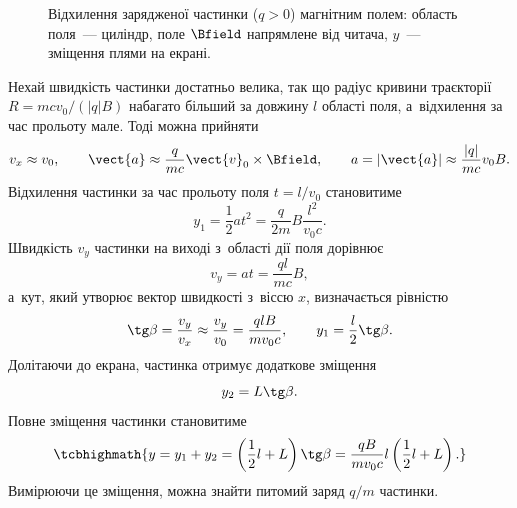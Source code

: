 \begin{figure}[h!]
	\centering
	\caption{Відхилення зарядженої частинки ($q>0$) магнітним полем: область поля~--- циліндр, поле $\Bfield$ напрямлене від читача, $y$~--- зміщення плями на екрані.}
	\label{tikz:magnetic_deflection}
\end{figure}

Нехай швидкість частинки достатньо велика, так що радіус кривини траєкторії $R = mcv_0/(|q|B)$ набагато більший за довжину $l$ області поля, а~відхилення за час прольоту мале. Тоді можна прийняти
\begin{equation}\label{eq:a_B_approx}
	v_x \approx v_0, \qquad
	\vect{a} \approx \frac{q}{mc}\vect{v}_0 \times \Bfield, \qquad
	a = |\vect{a}| \approx \frac{|q|}{mc}v_0 B.
\end{equation}
Відхилення частинки за час прольоту поля $t = l/v_0$ становитиме
\begin{equation}\label{eq:y1_B}
	y_1 = \frac{1}{2}at^2 = \frac{q}{2m}B\frac{l^2}{v_0 c}.
\end{equation}
Швидкість $v_y$ частинки на виході з~області дії поля дорівнює
\begin{equation}\label{eq:vy_B}
	v_y = at = \frac{ql}{mc}B,
\end{equation}
а~кут, який утворює вектор швидкості з~віссю $x$, визначається рівністю
\begin{equation}\label{eq:tg_beta}
	\tg\beta = \frac{v_y}{v_x} \approx \frac{v_y}{v_0} = \frac{qlB}{mv_0 c}, \qquad
	y_1 = \frac{l}{2}\tg\beta.
\end{equation}
Долітаючи до екрана, частинка отримує додаткове зміщення
\begin{equation}\label{eq:y2_B}
	y_2 = L \tg\beta.
\end{equation}
Повне зміщення частинки становитиме
\begin{equation}\label{eq:y_total_B}
	\tcbhighmath{
		y = y_1 + y_2 = \left(\frac{1}{2}l + L\right)\tg\beta = \frac{qB}{mv_0 c}l\left(\frac{1}{2}l + L\right).
	}
\end{equation}
Вимірюючи це зміщення, можна знайти питомий заряд $q/m$ частинки.

